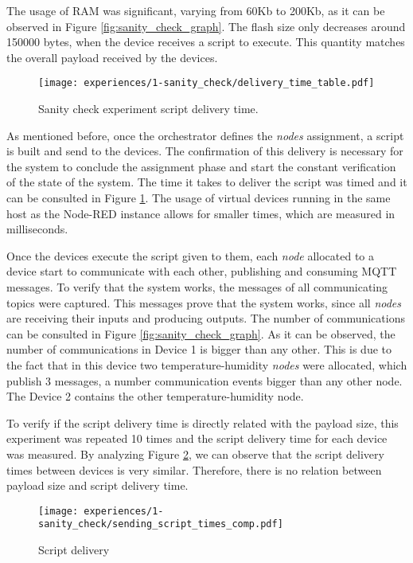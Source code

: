 The usage of RAM was significant, varying from 60Kb to 200Kb, as it can be observed in Figure \ref{fig:sanity_check_graph}. The flash size only decreases around 150000 bytes, when the device receives a script to execute. This quantity matches the overall payload received by the devices.

\begin{figure}[h]
\centering
\texttt{[image: experiences/1-sanity\_check/delivery\_time\_table.pdf]}
\caption[Sanity check experiment script delivery time.]{Sanity check experiment script delivery time.}\label{fig:sanity_check_delivery_time}
\end{figure}

As mentioned before, once the orchestrator defines the \textit{nodes} assignment, a script is built and send to the devices. The confirmation of this delivery is necessary for the system to conclude the assignment phase and start the constant verification of the state of the system. The time it takes to deliver the script was timed and it can be consulted in Figure \ref{fig:sanity_check_delivery_time}. The usage of virtual devices running in the same host as the Node-RED instance allows for smaller times, which are measured in milliseconds.

Once the devices execute the script given to them, each \textit{node} allocated to a device start to communicate with each other, publishing and consuming MQTT messages. To verify that the system works, the messages of all communicating topics were captured. This messages prove that the system works, since all \textit{nodes} are receiving their inputs and producing outputs. The number of communications can be consulted in Figure \ref{fig:sanity_check_graph}. As it can be observed, the number of communications in Device 1 is bigger than any other. This is due to the fact that in this device two temperature-humidity \textit{nodes} were allocated, which publish 3 messages, a number communication events bigger than any other node. The Device 2 contains the other temperature-humidity node.

To verify if the script delivery time is directly related with the payload size, this experiment was repeated 10 times and the script delivery time for each device was measured. By analyzing Figure \ref{fig:delivery_times_comp}, we can observe that the script delivery times between devices is very similar. Therefore, there is no relation between payload size and script delivery time.

\begin{figure}[h]
\centering
\texttt{[image: experiences/1-sanity\_check/sending\_script\_times\_comp.pdf]}
\caption[Script delivery times]{Script delivery}\label{fig:delivery_times_comp}
\end{figure}

